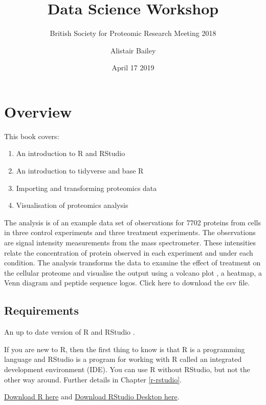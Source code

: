 \documentclass[12pt,]{book}
\title{Data Science Workshop}
\subtitle{British Society for Proteomic Research Meeting 2018}
\author{Alistair Bailey}
\date{April 17 2019}
\providecommand{\tightlist}{%
  \setlength{\itemsep}{0pt}\setlength{\parskip}{0pt}}
\begin{document}
\maketitle

{
\setcounter{tocdepth}{1}
\tableofcontents
}
\hypertarget{overview}{%
\chapter*{Overview}\label{overview}}

This book covers:

\begin{enumerate}
\def\labelenumi{\arabic{enumi}.}
\tightlist
\item
  An introduction to R and RStudio
\item
  An introduction to tidyverse and base R
\item
  Importing and transforming proteomics data
\item
  Visualisation of proteomics analysis
\end{enumerate}

The analysis is of an example data set of observations for 7702 proteins
from cells in three control experiments and three treatment experiments.
The observations are signal intensity measurements from the mass spectrometer.
These intensities relate the concentration of protein observed in each experiment
and under each condition. The analysis transforms the data to examine the effect of
treatment on the cellular proteome and visualise the output using a volcano
plot , a heatmap, a Venn diagram and peptide sequence logos.
Click here to download the csv file.

\hypertarget{requirements}{%
\section*{Requirements}\label{requirements}}

An up to date version of R \citep{R-base} and RStudio
\citep{rstudioteam2018}.

If you are new to R, then the first thing
to know is that R is a programming language and RStudio is a
program for working with R called an integrated development
environment (IDE). You can use R without RStudio, but not the other way around. Further details in Chapter
\ref{r-rstudio}.

\href{https://cran.r-project.org/}{Download R here} and
\href{https://www.rstudio.com/products/rstudio/download/}{Download RStudio Desktop here}.
\end{document}
